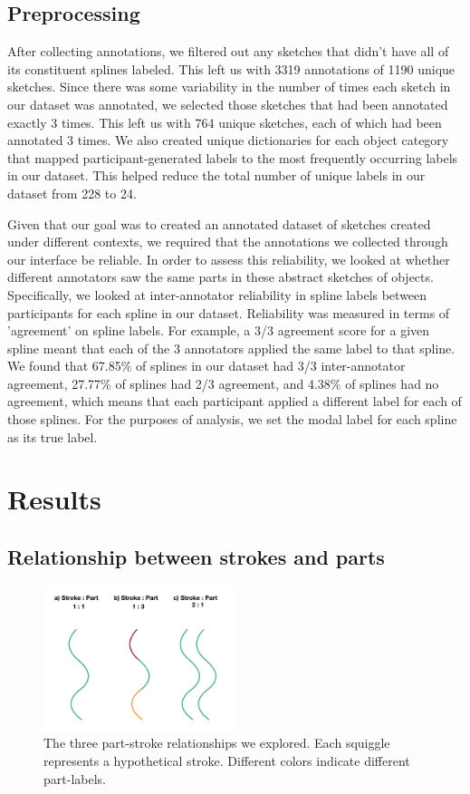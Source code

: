 \documentclass[10pt,letterpaper]{article}
\begin{document}
\subsection{Preprocessing}
After collecting annotations, we filtered out any sketches that didn't have all of its constituent splines labeled. This left us with 3319 annotations of 1190 unique sketches.
Since there was some variability in the number of times each sketch in our dataset was annotated, we selected those sketches that had been annotated exactly 3 times. This left us with 764 unique sketches, each of which had been annotated 3 times.
We also created unique dictionaries for each object category that mapped participant-generated labels to the most frequently occurring labels in our dataset. This helped reduce the total number of unique labels in our dataset from 228 to 24.

Given that our goal was to created an annotated dataset of sketches created under different contexts, we required that the annotations we collected through our interface be reliable. In order to assess this reliability, we looked at whether different annotators saw the same parts in these abstract sketches of objects. Specifically, we looked at inter-annotator reliability in spline labels between participants for each spline in our dataset. Reliability was measured in terms of 'agreement' on spline labels. For example, a 3/3 agreement score for a given spline meant that each of the 3 annotators applied the same label to that spline. We found that 67.85\% of splines in our dataset had 3/3 inter-annotator agreement, 27.77\% of splines had 2/3 agreement, and 4.38\% of splines had no agreement, which means that each participant applied a different label for each of those splines.
For the purposes of analysis, we set the modal label for each spline as its true label.

\section{Results}

\subsection{Relationship between strokes and parts}

\begin{figure}[htbp]
\centering
\includegraphics[width=0.5\textwidth]{figures/Part-Stroke.jpeg}
\caption{The three part-stroke relationships we explored. Each squiggle represents a hypothetical stroke. Different colors indicate different part-labels.}
\end{figure}
\end{document}

